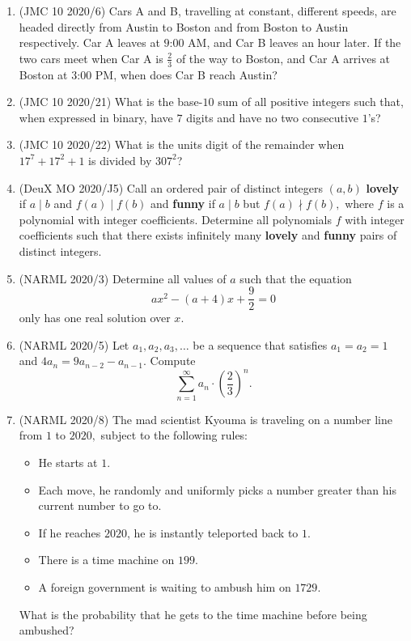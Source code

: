 \documentclass{article}
\begin{document}
\begin{enumerate}
\item (JMC 10 2020/6) Cars A and B, travelling at constant, different speeds, are headed directly from Austin to Boston and from Boston to Austin respectively. Car A leaves at $9\text{:}00$ AM, and Car B leaves an hour later. If the two cars meet when Car A is $\frac{2}{3}$ of the way to Boston, and Car A arrives at Boston at $3\text{:}00$ PM, when does Car B reach Austin?

\item (JMC 10 2020/21) What is the base-$10$ sum of all positive integers such that, when expressed in binary, have $7$ digits and have no two consecutive $1$'s?

\item (JMC 10 2020/22) What is the units digit of the remainder when $17^7+17^2+1$ is divided by $307^2$?

\item (DeuX MO 2020/J5) Call an ordered pair of distinct integers $(a,b)$ \textbf{lovely} if $a\mid b$ and $f(a)\mid f(b)$ and \textbf{funny} if $a\mid b$ but $f(a)\nmid f(b),$ where $f$ is a polynomial with integer coefficients. Determine all polynomials $f$ with integer coefficients such that there exists infinitely many \textbf{lovely} and \textbf{funny} pairs of distinct integers.

\item (NARML 2020/3) Determine all values of $a$ such that the equation\[ax^2-(a+4)x+\frac{9}{2}=0\]only has one real solution over $x.$

\item (NARML 2020/5) Let $a_1,a_2,a_3,\ldots$ be a sequence that satisfies $a_1=a_2=1$ and $4a_n=9a_{n-2}-a_{n-1}.$ Compute
\[\sum_{n=1}^{\infty}a_n\cdot \left(\frac{2}{3}\right)^n.\]

\item (NARML 2020/8) The mad scientist Kyouma is traveling on a number line from $1$ to $2020,$ subject to the following rules:
\begin{itemize}
\item He starts at $1.$
\item Each move, he randomly and uniformly picks a number greater than his current number to go to.
\item If he reaches $2020$, he is instantly teleported back to $1.$
\item There is a time machine on $199.$
\item A foreign government is waiting to ambush him on $1729.$
\end{itemize}
What is the probability that he gets to the time machine before being ambushed?


\end{enumerate}
\end{document}
